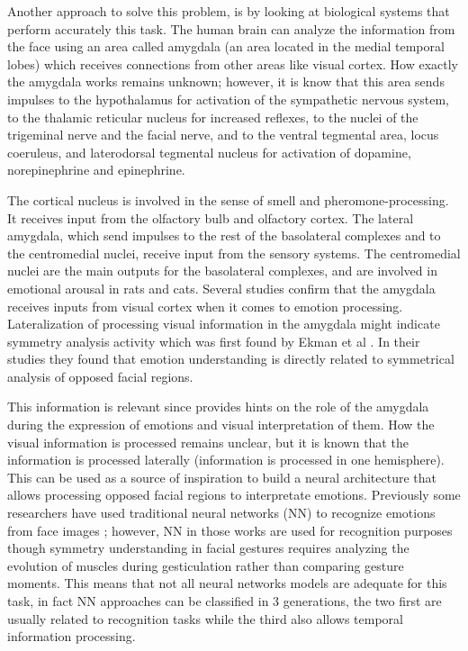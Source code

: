 Another approach to solve this problem, is by looking at biological systems that perform accurately this task. The human brain can analyze the information from the face using an area called amygdala \cite{Sergerie2008} (an area located in the medial temporal lobes) which receives connections from other areas like visual cortex. How exactly the amygdala works remains unknown; however, it is know that this area sends impulses to the hypothalamus for activation of the sympathetic nervous system, to the thalamic reticular nucleus for increased reflexes, to the nuclei of the trigeminal nerve and the facial nerve, and to the ventral tegmental area, locus coeruleus, and laterodorsal tegmental nucleus for activation of dopamine, norepinephrine and epinephrine.%

The cortical nucleus is involved in the sense of smell and pheromone-processing. It receives input from the olfactory bulb and olfactory cortex. The lateral amygdala, which send impulses to the rest of the basolateral complexes and to the centromedial nuclei, receive input from the sensory systems. The centromedial nuclei are the main outputs for the basolateral complexes, and are involved in emotional arousal in rats and cats. Several studies confirm that the amygdala receives inputs from visual cortex when it comes to emotion processing. Lateralization of processing visual information in the amygdala might indicate symmetry analysis activity which was first found by Ekman et al \cite{Hager1979}. In their studies they found that emotion understanding is directly related to symmetrical analysis of opposed facial regions.

This information is relevant since provides hints on the role of the amygdala during the expression of emotions and visual interpretation of them. How the visual information is processed remains unclear, but it is known that the information is processed laterally (information is processed in one hemisphere). This can be used as a source of inspiration to build a neural architecture that allows processing opposed facial regions to interpretate emotions. Previously some researchers have used traditional neural networks (NN) to recognize emotions from face images\cite{Spiros2005}%
; however, NN in those works are used for recognition purposes though symmetry understanding in facial gestures requires analyzing the evolution of muscles during gesticulation rather than comparing gesture moments. This means that not all neural networks models are adequate for this task, in fact NN approaches can be classified in 3 generations, the two first are usually related to recognition tasks while the third also allows temporal information processing.

